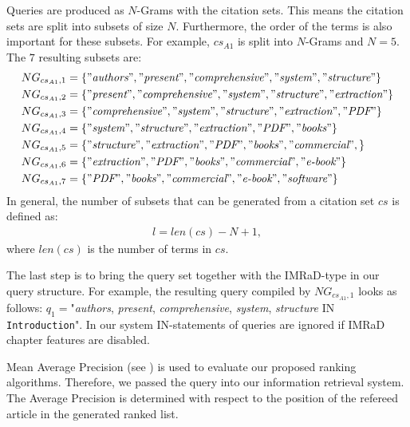 Queries are produced as $N$-Grams with the citation sets. This means the citation sets are split into subsets of size $N$. Furthermore, the order of the terms is also important for these subsets. For example, $cs_{A1}$ is split into $N$-Grams and $N = 5$. The $7$ resulting subsets are:
\begin{align*}
  NG_{cs_{A1}, 1} &= \{"\textit{authors}", "\textit{present}", "\textit{comprehensive}", "\textit{system}", "\textit{structure}"\} \nonumber \\
  NG_{cs_{A1}, 2} &= \{"\textit{present}", "\textit{comprehensive}", "\textit{system}", "\textit{structure}", "\textit{extraction}"\} \nonumber \\
  NG_{cs_{A1}, 3} &= \{"\textit{comprehensive}", "\textit{system}", "\textit{structure}", "\textit{extraction}", "\textit{PDF}"\} \nonumber \\
  NG_{cs_{A1}, 4} &= \{"\textit{system}", "\textit{structure}", "\textit{extraction}", "\textit{PDF}", "\textit{books}"\} \nonumber \\
  NG_{cs_{A1}, 5} &= \{"\textit{structure}", "\textit{extraction}", "\textit{PDF}", "\textit{books}", "\textit{commercial}",\} \nonumber \\
  NG_{cs_{A1}, 6} &= \{"\textit{extraction}", "\textit{PDF}", "\textit{books}", "\textit{commercial}", "\textit{e-book}"\} \nonumber \\
  NG_{cs_{A1}, 7} &= \{"\textit{PDF}", "\textit{books}", "\textit{commercial}", "\textit{e-book}", "\textit{software}"\} \nonumber \\
\end{align*}
In general, the number of subsets that can be generated from a citation set $cs$ is defined as:
\begin{align}
  l = len(cs) - N + 1,
\end{align}
where $len(cs)$ is the number of terms in $cs$. 

The last step is to bring the query set together with the IMRaD-type in our query structure. For example, the resulting query compiled by $NG_{cs_{A1}, 1}$ looks as follows: $q_1=$"\textit{authors}, \textit{present}, \textit{comprehensive}, \textit{system}, \textit{structure} IN \texttt{Introduction}". In our system IN-statements of queries are ignored if IMRaD chapter features are disabled.

Mean Average Precision (see ) is used to evaluate our proposed ranking algorithms. Therefore, we passed the query into our information retrieval system. The Average Precision is determined with respect to the position of the refereed article in the generated ranked list.

